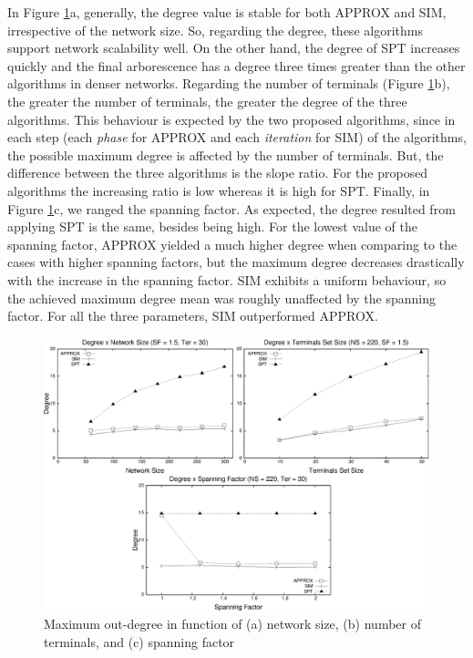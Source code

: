 In Figure \ref{fig:degree_abscissae}a, generally, the degree value is stable for both APPROX and SIM, 
irrespective of the network size. So, regarding the degree, these algorithms support network scalability well. 
On the other hand, the degree of SPT increases quickly and the final arborescence has a degree three times greater than the other algorithms in denser networks. 
Regarding the number of terminals (Figure \ref{fig:degree_abscissae}b), the greater the number of terminals, the greater the degree of the three algorithms. This behaviour is expected by the 
two proposed algorithms, since in each step (each \emph{phase} for APPROX and each \emph{iteration} for SIM) of the algorithms, the possible maximum 
degree is affected by the number of terminals. But, the difference between the three algorithms is the slope ratio. For the proposed algorithms the 
increasing ratio is low whereas it is high for SPT. Finally, in Figure \ref{fig:degree_abscissae}c, we ranged the spanning factor. As expected, 
the degree resulted from applying SPT is the same, besides being high. For the lowest value of the spanning factor,
APPROX yielded a much higher degree when comparing to the cases with higher spanning factors,
but the maximum degree decreases drastically with the increase in the spanning factor.
SIM exhibits a uniform behaviour, so the achieved maximum degree mean was roughly unaffected by the spanning factor. For all the three parameters, SIM outperformed APPROX.
\begin{figure}[!th]
\centering
\includegraphics[scale=0.63]{imagens/grau-220-3_graficos_nao_alinhados}
\caption{Maximum out-degree in function of (a) network size, (b) number of terminals, and (c) spanning factor}
\label{fig:degree_abscissae}
\end{figure}
